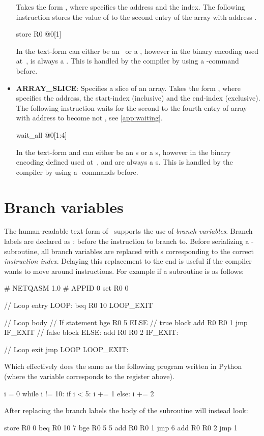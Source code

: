 \begin{itemize}
        Takes the form , where  specifies the address and  the index.
        The following instruction stores the value of  to the second entry of the array with address .
        \begin{nqcode}
store R0 @0[1]\end{nqcode}
        In the text-form  can either be an \IMMEDIATE\ or a \REGISTER, however in the binary encoding used at~\cite{git_netqasm},  is always a \REGISTER.
        This is handled by the compiler by using a -command before.
  \item \textbf{ARRAY\_SLICE}: Specifies a slice of an array.
        Takes the form , where  specifies the address,  the start-index (inclusive) and  the end-index (exclusive).
        The following instruction waits for the second to the fourth entry of array with address  to become not , see \cref{app:waiting}.
        \begin{nqcode}
wait_all @0[1:4]\end{nqcode}
        In the text-form  and  can either be an \IMMEDIATE{}s or a \REGISTER{}s, however in the binary encoding defined used at~\cite{git_netqasm},  and  are always a \REGISTER{}s.
        This is handled by the compiler by using a -commands before.
\end{itemize}

\section{Branch variables}\label{sec:branch_variables}
The human-readable text-form of \netqasm\ supports the use of \emph{branch variables}.
Branch labels are declared as : before the instruction to branch to.
Before serializing a \netqasm-subroutine, all branch variables are replaced with \IMMEDIATE{}s corresponding to the correct \emph{instruction index}.
Delaying this replacement to the end is useful if the compiler wants to move around instructions.
For example if a subroutine is as follows:
\begin{nqcode}
# NETQASM 1.0
# APPID 0
set R0 0

// Loop entry
LOOP:
beq R0 10 LOOP_EXIT

// Loop body
// If statement
bge R0 5 ELSE
// true block
add R0 R0 1
jmp IF_EXIT
// false block
ELSE:
add R0 R0 2
IF_EXIT:

// Loop exit
jmp LOOP
LOOP_EXIT:\end{nqcode}
Which effectively does the same as the following program written in Python (where the variable  corresponds to the register  above).
\begin{pycode}
i = 0
while i != 10:
  if i < 5:
    i += 1
  else:
    i += 2
\end{pycode}
After replacing the branch labels the body of the subroutine will instead look:
\begin{nqcode}
store R0 0
beq R0 10 7
bge R0 5 5
add R0 R0 1
jmp 6
add R0 R0 2
jmp 1\end{nqcode}

